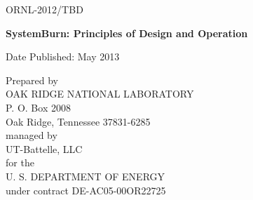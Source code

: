 \documentclass[11pt]{article}
\begin{document}
\newpage

\begin{titlepage}

\begin{flushright}ORNL-2012/TBD
\end{flushright}

\vspace{1.25in}

\begin{center}
{\bf{
SystemBurn: Principles of Design and Operation
}}
\vspace{0.5in}

\author{\\
Jeffery A. Kuehn, Stephen W. Poole, Stephen W. Hodson, \\
Joshua K. Lothian, Matthew B. Baker, Jonathan D. Dobson, \\
David B. Reister, Nicholas R. Lewkow, S. Ross Glandon, \\
Jacob T. Peek \\
\\
The Extreme Scale Systems Center \\
Computer Science and Mathematics Division \\
Oak Ridge National Laboratory \\
Oak Ridge, TN 37831 \\
http://www.csm.ornl.gov/essc\\
\\
\\
kuehn@ornl.gov, spoole@ornl.gov, hodsonsw@ornl.gov,\\
lothian@ornl.gov, bakermb@ornl.gov, dobsonjd@ornl.gov, \\
dbr@ornl.gov, lewkownr@ornl.gov, glandonsr@ornl.gov, \\
peekjt@ornl.gov\\
}


\vspace{1in}

Date Published: May 2013

\vspace{1in}

Prepared by \\
OAK RIDGE NATIONAL LABORATORY \\
P. O. Box 2008 \\
Oak Ridge, Tennessee 37831-6285 \\
managed by \\
UT-Battelle, LLC \\
for the \\
U. S. DEPARTMENT OF ENERGY \\
under contract DE-AC05-00OR22725

\end{center}

\end{titlepage}
\end{document}
